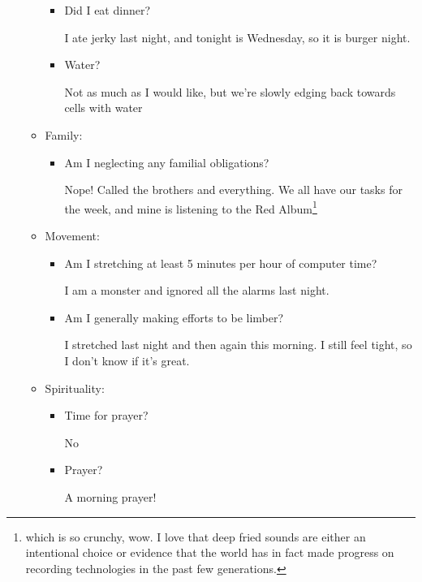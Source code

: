 \documentclass[12pt]{article}
\renewcommand{\,}{\textsuperscript{,}}
\begin{document}
\begin{enumerate}
\begin{itemize}
\begin{itemize}
\item Did I eat dinner?

I ate jerky last night, and tonight is Wednesday, so it is burger night.

\item Water?

Not as much as I would like, but we're slowly edging back towards cells with water

\end{itemize}

\item Family:

\begin{itemize}

\item Am I neglecting any familial obligations?

Nope! Called the brothers and everything. We all have our tasks for the week, and mine is listening to the Red Album\footnote{which is so crunchy, wow. I love that deep fried sounds are either an intentional choice or evidence that the world has in fact made progress on recording technologies in the past few generations.}

\end{itemize}

\item Movement:

\begin{itemize}

\item Am I stretching at least 5 minutes per hour of computer time?

I am a monster and ignored all the alarms last night.

\item Am I generally making efforts to be limber?

I stretched last night and then again this morning.  
I still feel tight, so I don't know if it's great.

\end{itemize}

\item Spirituality:

\begin{itemize}

\item Time for prayer?

No

\item Prayer?

A morning prayer!


\end{itemize}
\end{itemize}
\end{enumerate}
\end{document}
